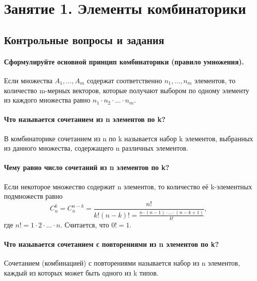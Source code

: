 \documentclass{book}
\begin{document}
\tableofcontents

\pagestyle{plain}

\chapter*{Занятие 1. Элементы комбинаторики}

\section*{Контрольные вопросы и задания}

\subsubsection*{Сформулируйте основной принцип комбинаторики (правило умножения).}

Если множества $A_1,  \dotsc , A_m$ содержат соответственно $n_1,  \dotsc , n_m$ элементов, то количество m-мерных векторов, которые получают выбором по одному элементу из каждого множества равно $n_1\cdot n_2\cdot \dotsc \cdot n_m$.

\subsubsection*{Что называется сочетанием из n элементов по k?}

В комбинаторике сочетанием из n по k называется набор k элементов, выбранных из данного множества, содержащего n различных элементов.

\subsubsection*{Чему равно число сочетаний из n элементов по k?}

Если некоторое множество содержит n элементов, то количество её k-элементных подмножеств равно $$C_n^k=C_n^{n-k}=\frac{n!}{k!\left(n-k\right)!=\frac{n\cdot\left(n-1\right)\cdot \dotsc \cdot\left(n-k+1\right)}{k!}},$$ где $n!=1\cdot 2\cdot \dotsc \cdot n$. Считается, что $0!=1$.

\subsubsection*{Что называется сочетанием с повторениями из n элементов по k?}

Сочетанием (комбинацией) с повторениями называется набор из n элементов, каждый из которых может быть одного из k типов.
\end{document}
